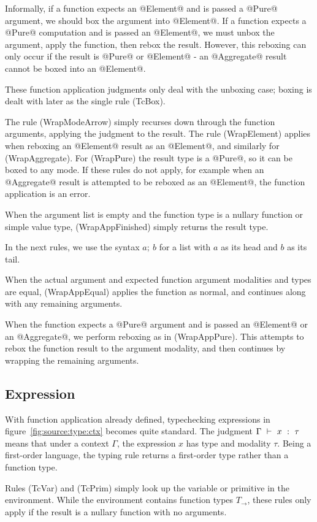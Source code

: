 Informally, if a function expects an @Element@ and is passed a @Pure@ argument, we should box the argument into @Element@.
If a function expects a @Pure@ computation and is passed an @Element@, we must unbox the argument, apply the function, then rebox the result.
However, this reboxing can only occur if the result is @Pure@ or @Element@ - an @Aggregate@ result cannot be boxed into an @Element@.

These function application judgments only deal with the unboxing case; boxing is dealt with later as the single rule (TcBox).

The rule (WrapModeArrow) simply recurses down through the function arguments, applying the judgment to the result.
The rule (WrapElement) applies when reboxing an @Element@ result as an @Element@, and similarly for (WrapAggregate).
For (WrapPure) the result type is a @Pure@, so it can be boxed to any mode.
If these rules do not apply, for example when an @Aggregate@ result is attempted to be reboxed as an @Element@, the function application is an error.

When the argument list is empty and the function type is a nullary function or simple value type, (WrapAppFinished) simply returns the result type.

In the next rules, we use the syntax $a;~b$ for a list with $a$ as its head and $b$ as its tail.

When the actual argument and expected function argument modalities and types are equal, (WrapAppEqual) applies the function as normal, and continues along with any remaining arguments.

When the function expects a @Pure@ argument and is passed an @Element@ or an @Aggregate@, we perform reboxing as in (WrapAppPure).
This attempts to rebox the function result to the argument modality, and then continues by wrapping the remaining arguments.



\subsection{Expression}
With function application already defined, typechecking expressions in figure~\ref{fig:source:type:ctx} becomes quite standard.
The judgment $\Gamma ~\vdash~ x ~:~ \tau$ means that under a context $\Gamma$, the expression $x$ has type and modality $\tau$.
Being a first-order language, the typing rule returns a first-order type rather than a function type.

Rules (TcVar) and (TcPrim) simply look up the variable or primitive in the environment.
While the environment contains function types $T_\to$, these rules only apply if the result is a nullary function with no arguments.

